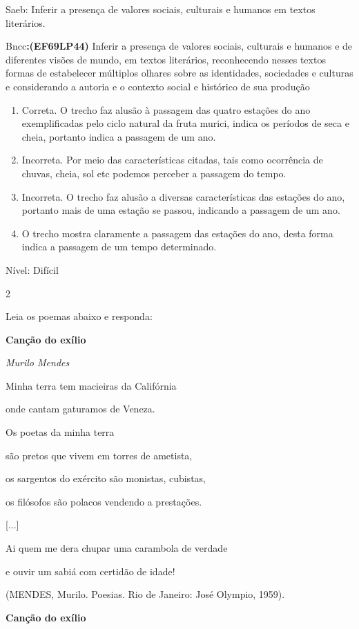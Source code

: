 {Saeb: Inferir a presença de valores sociais, culturais e humanos em
textos literários.

Bncc\textbf{:(EF69LP44)} Inferir a presença de valores sociais,
culturais e humanos e de diferentes visões de mundo, em textos
literários, reconhecendo nesses textos formas de estabelecer múltiplos
olhares sobre as identidades, sociedades e culturas e considerando a
autoria e o contexto social e histórico de sua produção

\begin{enumerate}
\def\labelenumi{\arabic{enumi}.}
\item
  Correta. O trecho faz alusão à passagem das quatro estações do ano
  exemplificadas pelo ciclo natural da fruta murici, indica os períodos
  de seca e cheia, portanto indica a passagem de um ano.
\item
  Incorreta. Por meio das características citadas, tais como ocorrência
  de chuvas, cheia, sol etc podemos perceber a passagem do tempo.
\item
  Incorreta. O trecho faz alusão a diversas características das estações
  do ano, portanto mais de uma estação se passou, indicando a passagem
  de um ano.
\item
  O trecho mostra claramente a passagem das estações do ano, desta forma
  indica a passagem de um tempo determinado.
\end{enumerate}

Nível: Difícil

\num{2}

Leia os poemas abaixo e responda:

\textbf{Canção do exílio}

\emph{Murilo Mendes}

Minha terra tem macieiras da Califórnia

onde cantam gaturamos de Veneza.

Os poetas da minha terra

são pretos que vivem em torres de ametista,

os sargentos do exército são monistas, cubistas,

os filósofos são polacos vendendo a prestações.

{[}...{]}

Ai quem me dera chupar uma carambola de verdade

e ouvir um sabiá com certidão de idade!

(MENDES, Murilo. Poesias. Rio de Janeiro: José Olympio, 1959).

\textbf{Canção do exílio}

}
